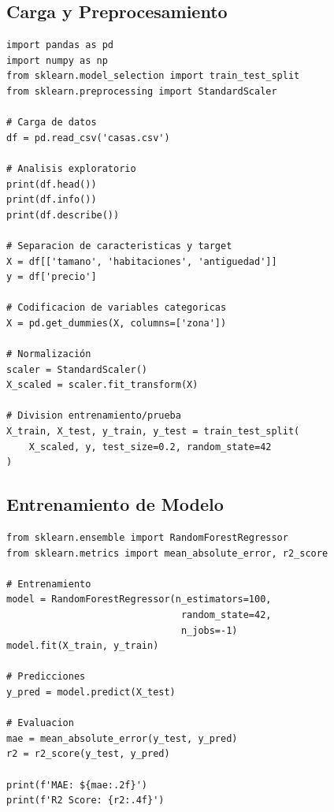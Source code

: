 \documentclass[12pt,a4paper]{article}
\begin{document}
\subsection{Carga y Preprocesamiento}
\begin{lstlisting}
import pandas as pd
import numpy as np
from sklearn.model_selection import train_test_split
from sklearn.preprocessing import StandardScaler

# Carga de datos
df = pd.read_csv('casas.csv')

# Analisis exploratorio
print(df.head())
print(df.info())
print(df.describe())

# Separacion de caracteristicas y target
X = df[['tamano', 'habitaciones', 'antiguedad']]
y = df['precio']

# Codificacion de variables categoricas
X = pd.get_dummies(X, columns=['zona'])

# Normalización
scaler = StandardScaler()
X_scaled = scaler.fit_transform(X)

# Division entrenamiento/prueba
X_train, X_test, y_train, y_test = train_test_split(
    X_scaled, y, test_size=0.2, random_state=42
)
\end{lstlisting}

\subsection{Entrenamiento de Modelo}
\begin{lstlisting}
from sklearn.ensemble import RandomForestRegressor
from sklearn.metrics import mean_absolute_error, r2_score

# Entrenamiento
model = RandomForestRegressor(n_estimators=100, 
                               random_state=42, 
                               n_jobs=-1)
model.fit(X_train, y_train)

# Predicciones
y_pred = model.predict(X_test)

# Evaluacion
mae = mean_absolute_error(y_test, y_pred)
r2 = r2_score(y_test, y_pred)

print(f'MAE: ${mae:.2f}')
print(f'R2 Score: {r2:.4f}')
\end{lstlisting}
\end{document}
